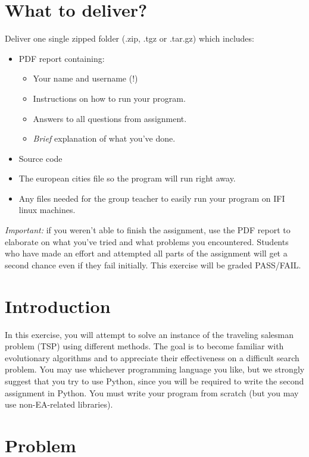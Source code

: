 \section*{What to deliver?}
Deliver one single zipped folder (.zip, .tgz or .tar.gz) which includes:
\begin{itemize}
    \item PDF report containing:
    \begin{itemize}
        \item Your name and username (!)
        \item Instructions on how to run your program.
        \item Answers to all questions from assignment.
        \item \emph{Brief} explanation of what you've done.
    \end{itemize}
    \item Source code
    \item The european cities file so the program will run right away.
    \item Any files needed for the group teacher to easily run your program on
          IFI linux machines.
\end{itemize}
\emph{Important: } if you weren't able to finish the assignment, use the PDF
report to elaborate on what you've tried and what problems you encountered.
Students who have made an effort and attempted all parts of the assignment
will get a second chance even if they fail initially. This exercise will be
graded PASS/FAIL.
\section*{Introduction}
In this exercise, you will attempt to solve an instance of the traveling
salesman problem (TSP) using different methods. The goal is to become familiar
with evolutionary algorithms and to appreciate their effectiveness on a
difficult search problem. You may use
whichever programming language you like, but we strongly suggest that you try
to use Python, since you will be required to write the second assignment in
Python. You must write your program from scratch (but you may use
non-EA-related libraries).

\section*{Problem}

